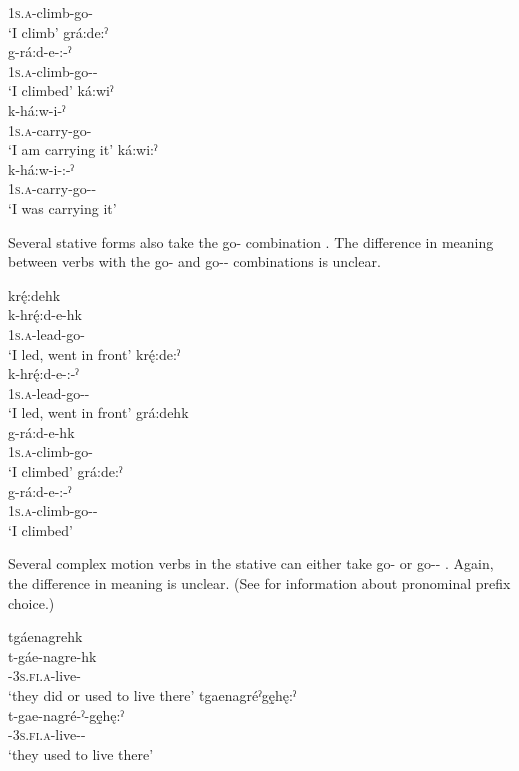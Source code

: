  \textsc{1s.a}-climb-go-{\stative}\\
\glt `I climb'
\ex grá:de:ˀ\\
    \gll g-rá:d-e-:-ˀ\\
    \textsc{1s.a}-climb-go-{\purposive}-{\stative}\\
    \glt ‘I climbed’
\z 
\ex 
\ea ká:wiˀ \\
\gll k-há:w-i-ˀ\\
\textsc{1s.a}-carry-go-{\stative}\\
\glt ‘I am carrying it’
\ex ká:wi:ˀ\\ 
    \gll k-há:w-i-:-ˀ\\
    \textsc{1s.a}-carry-go-{\purposive}-{\stative}\\
    \glt ‘I was carrying it’
\z 
\z
\z

Several stative forms also take the  go-{\former} combination . The difference in meaning between verbs with the  go-{\former} and  go-{\purposive}-{\stative} combinations is unclear.

\ea\label{ex:complmotex5}
\ea krę́:dehk\\
\gll k-hrę́:d-e-hk\\
 \textsc{1s.a}-lead-go-{\former}\\
\glt `I led, went in front'
\ex krę́:de:ˀ\\ 
    \gll k-hrę́:d-e-:-ˀ\\
    \textsc{1s.a}-lead-go-{\purposive}-{\stative}\\
    \glt ‘I led, went in front’
\z 
\ex 
\ea grá:dehk\\
\gll g-rá:d-e-hk\\
 \textsc{1s.a}-climb-go-{\former}\\
\glt `I climbed'
\ex grá:de:ˀ\\ 
    \gll g-rá:d-e-:-ˀ\\
    \textsc{1s.a}-climb-go-{\purposive}-{\stative}\\
    \glt ‘I climbed’
\z 
\z


Several complex motion verbs in the stative can either take  go-{\former}  or  go-{\stative}-{\past} . Again, the difference in meaning is unclear. (See  for information about pronominal prefix choice.)

\ea\label{ex:complmotex25}
\ea tgáenagrehk\\\label{ex:complmotex25a}
\gll t-gáe-nagre-hk\\
 {\cislocative}-\textsc{3s.fi.a}-live-{\former}\\
\glt `they did or used to live there'
\ex tgaenagréˀgę̱hę:ˀ\\\label{ex:complmotex25b}
\gll t-gae-nagré-ˀ-gę̱hę:ˀ\\
 {\cislocative}-\textsc{3s.fi.a}-live-{\stative}-{\past}\\
\glt `they used to live there'
\z
\z





